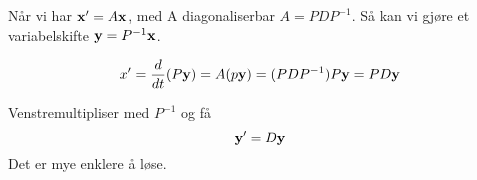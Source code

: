 Når vi har $\mathbf{x}' = A\mathbf{x}$, med A diagonaliserbar $A = PDP^{-1}$.
Så kan vi gjøre et variabelskifte $\mathbf{y} = P^{-1}\mathbf{x}$.

$$x' = \frac{d}{dt}(P\mathbf{y})
     = A (p\mathbf{y})
     = (PDP^{-1})P\mathbf{y}
     = PD\mathbf{y}$$

Venstremultipliser med $P^{-1}$ og få
$$\mathbf{y}' = D\mathbf{y}$$
Det er mye enklere å løse.
